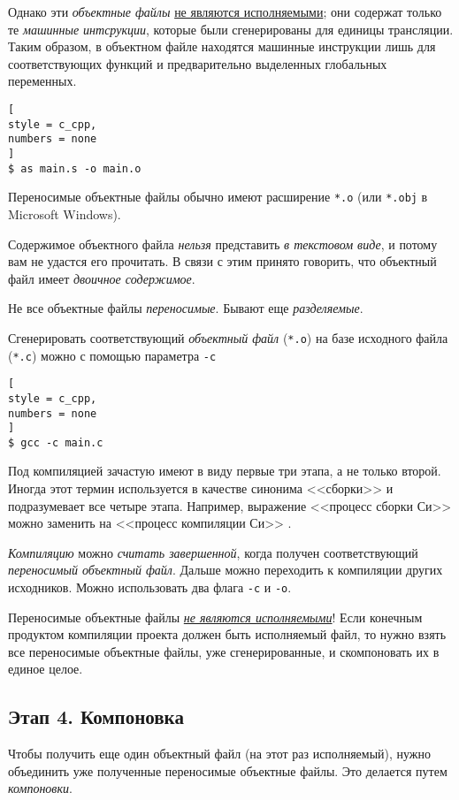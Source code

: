 \documentclass[%
	11pt,
	a4paper,
	utf8,
		]{article}
\begin{document}
Однако эти \emph{объектные файлы} \underline{не являются исполняемыми}; они содержат только те \emph{машинные интсрукции}, которые были сгенерированы для единицы трансляции. Таким образом, в объектном файле находятся машинные инструкции лишь для соответствующих функций и предварительно выделенных глобальных переменных.

\begin{lstlisting}[
style = c_cpp,
numbers = none
]
$ as main.s -o main.o
\end{lstlisting}

Переносимые объектные файлы обычно имеют расширение \verb|*.o| (или \verb|*.obj| в Microsoft Windows).

Содержимое объектного файла \emph{нельзя} представить \emph{в текстовом виде}, и потому вам не удастся его прочитать. В связи с этим принято говорить, что объектный файл имеет \emph{двоичное содержимое}.

Не все объектные файлы \emph{переносимые}. Бывают еще \emph{разделяемые}.

Сгенерировать соответствующий \emph{объектный файл} (\verb|*.o|) на базе исходного файла (\verb|*.c|) можно с помощью параметра \verb|-c|
\begin{lstlisting}[
style = c_cpp,
numbers = none
]
$ gcc -c main.c
\end{lstlisting}

Под компиляцией зачастую имеют в виду первые три этапа, а не только второй. Иногда этот термин используется в качестве синонима <<сборки>> и подразумевает все четыре этапа. Например, выражение <<процесс сборки Си>> можно заменить на <<процесс компиляции Си>> \cite[]{amini-extreme-c:2022}.

\emph{Компиляцию} можно \emph{считать завершенной}, когда получен соответствующий \emph{переносимый объектный файл}. Дальше можно переходить к компиляции других исходников. Можно использовать два флага \verb|-c| и \verb|-o|.

Переносимые объектные файлы \underline{\itshape не являются исполняемыми}! Если конечным продуктом компиляции проекта должен быть исполняемый файл, то нужно взять все переносимые объектные файлы, уже сгенерированные, и скомпоновать их в единое целое.

\subsection{Этап 4. Компоновка}

Чтобы получить еще один объектный файл (на этот раз исполняемый), нужно объединить уже полученные переносимые объектные файлы. Это делается путем \emph{компоновки}.
\end{document}
